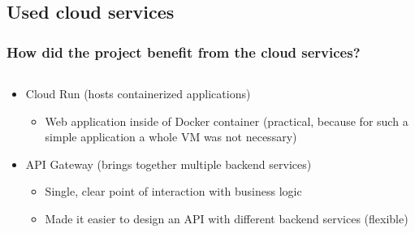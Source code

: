 \documentclass[aspectratio=169,16pt]{beamer}
\begin{document}
\begin{frame}
\begin{columns}[onlytextwidth]
\begin{column}{0.35\textwidth}
\begin{figure}
            \end{figure}
        \end{column}
    \end{columns}
\end{frame}

\subsection{Used cloud services}
\begin{frame}
    \frametitle{How did the project benefit from the cloud services?}

    \begin{columns}[onlytextwidth]
        \begin{column}{0.5\textwidth}

            \begin{itemize}
                \item Cloud Run (hosts containerized applications)
                      \begin{itemize}
                          \item Web application inside of Docker container (practical, because for such a simple
                                application a whole VM was not necessary)
                      \end{itemize}
                \item API Gateway (brings together multiple backend services)
                      \begin{itemize}
                          \item Single, clear point of interaction with business logic
                          \item Made it easier to design an API with different backend services (flexible)
                      \end{itemize}
            \end{itemize}


\end{column}
\end{columns}
\end{frame}
\end{document}
